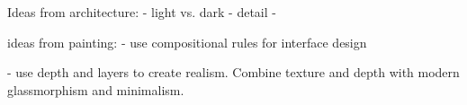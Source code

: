 Ideas from architecture:
- light vs. dark
- detail
-


ideas from painting:
- use compositional rules for interface design


- use depth and layers to create realism. Combine texture and depth with modern glassmorphism and minimalism.
